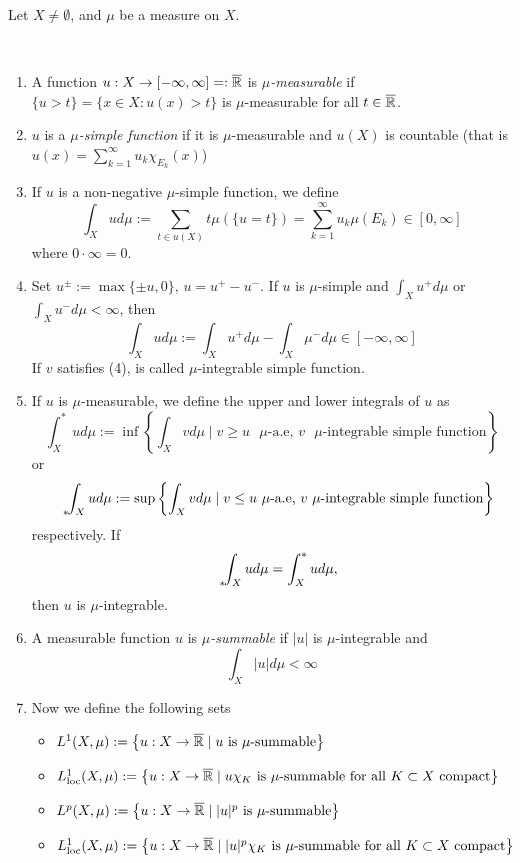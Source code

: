Let $X \neq \emptyset$, and $\mu$ be a measure on $X$.

\begin{definition}~
\begin{enumerate}[(1)]
\item A function $u : X \to [-\infty,\infty] =: \overline{\mathbb{R}}$ is \emph{$\mu$-measurable} if
$\{u > t\} = \{ x \in X : u(x) > t\}$ is $\mu$-measurable for all $t\in
\overline{\mathbb{R}}$.
\item $u$ is a \emph{$\mu$-simple function} if it is $\mu$-measurable and $u(X)$ is
countable (that is $u(x) = \sum_{k=1}^\infty u_k \chi_{E_k}(x)$)
\item If $u$ is a non-negative $\mu$-simple function, we define 
\[
\int_X u d\mu := \sum_{t \in u(X)} t\mu(\{u=t\}) = \sum_{k=1}^\infty u_k
\mu(E_k) \in [0,\infty]
\]
where $0 \cdot \infty = 0$.
\item Set $u^\pm := \max\{\pm u, 0 \}$, $u = u^+ - u^-$. 
If $u$ is $\mu$-simple and $\int_X u^+ d\mu$ or $\int_X u^- d\mu < \infty$, then
\[
\int_X u d\mu := \int_X u^+ d\mu - \int_X \mu^- d\mu \in [-\infty,\infty]
\]
If $v$ satisfies (4), is called $\mu$-integrable simple function.
\item If $u$ is $\mu$-measurable, we define the upper and lower integrals of $u$
as
\[
\int^*_X u d\mu := \inf \left\{ \int_X v d\mu \mid 
\text{$v \geq u$ $\mu$-a.e, $v$ $\mu$-integrable simple function}
\right\}
\]
or
\[
{\phantom{\int}}_{*}\hspace{-0.3em}\int_{X} u d\mu := \sup\left\{ \int_X v d\mu \mid 
\text{$v \leq u$ $\mu$-a.e, $v$ $\mu$-integrable simple function}
\right\}
\]
respectively. 
If
\[
{\phantom{\int}}_{*}\hspace{-0.3em}\int_{X} u d\mu = \int^*_X u d\mu,
\]
then $u$ is $\mu$-integrable.
\item A measurable function $u$ is \emph{$\mu$-summable} if $|u|$ is
$\mu$-integrable and 
\[
\int_X |u| d\mu < \infty
\]
\item Now we define the following sets 
\begin{itemize}[]
\item $L^1(X,\mu) := \left\{ u: X \to \overline{\mathbb{R}} \mid \text{$u$ is
$\mu$-summable} \right\}$
\item $L_{\textnormal{loc}}^1(X,\mu) := \left\{ u: X \to \overline{\mathbb{R}} \mid
\text{$u\chi_K$ is
$\mu$-summable for all $K\subset X$ compact} \right\}$
\item $L^p(X,\mu) := \left\{ u: X \to \overline{\mathbb{R}} \mid \text{$|u|^p$ is
$\mu$-summable} \right\}$
\item $L_{\textnormal{loc}}^1(X,\mu) := \left\{ u: X \to \overline{\mathbb{R}} \mid
\text{$|u|^p\chi_K$ is
$\mu$-summable for all $K\subset X$ compact} \right\}$
\end{itemize}
\end{enumerate}
\end{definition}

